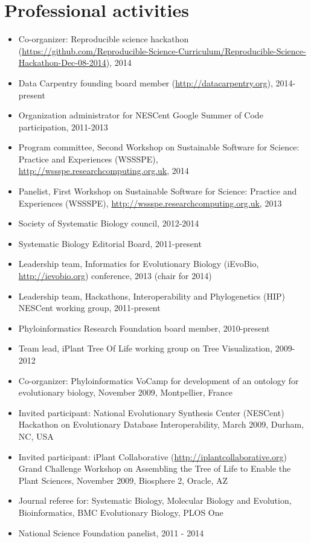\documentclass[10pt]{article}
\begin{document}
\section*{Professional activities}
\begin{itemize}
\item{Co-organizer: Reproducible science hackathon (\url{https://github.com/Reproducible-Science-Curriculum/Reproducible-Science-Hackathon-Dec-08-2014}), 2014}
\item{Data Carpentry founding board member (\url{http://datacarpentry.org}), 2014-present}
\item{Organization administrator for NESCent Google Summer of Code participation, 2011-2013}
\item{Program committee, Second Workshop on Sustainable Software for Science: Practice and Experiences (WSSSPE), \url{http://wssspe.researchcomputing.org.uk}, 2014}
\item{Panelist, First Workshop on Sustainable Software for Science: Practice and Experiences (WSSSPE), \url{http://wssspe.researchcomputing.org.uk}, 2013}
\item{Society of Systematic Biology council, 2012-2014}
\item{Systematic Biology Editorial Board, 2011-present}
\item{Leadership team, Informatics for Evolutionary Biology (iEvoBio, \url{http://ievobio.org}) conference, 2013 (chair for 2014)}
\item{Leadership team, Hackathons, Interoperability and Phylogenetics (HIP) NESCent working group, 2011-present}
\item{Phyloinformatics Research Foundation board member, 2010-present}
\item{Team lead, iPlant Tree Of Life working group on Tree Visualization, 2009-2012}
\item{Co-organizer: Phyloinformatics VoCamp for development of an ontology for evolutionary biology, November 2009, Montpellier, France}
\item{Invited participant: National Evolutionary Synthesis Center (NESCent) Hackathon on Evolutionary Database Interoperability, March 2009, Durham, NC, USA}
\item{Invited participant: iPlant Collaborative (\url{http://iplantcollaborative.org}) Grand Challenge Workshop on Assembling the Tree of Life to Enable the Plant Sciences, November 2009, Biosphere 2, Oracle, AZ}
\item{Journal referee for: Systematic Biology, Molecular Biology and Evolution, Bioinformatics, BMC Evolutionary Biology, PLOS One}
\item{National Science Foundation panelist, 2011 - 2014}
\end{itemize}
\end{document}
